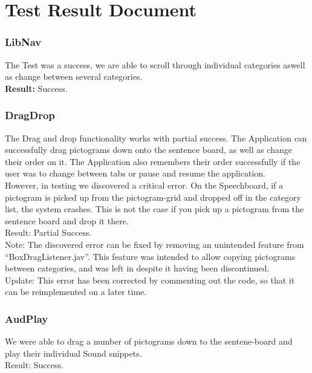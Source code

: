\section{Test Result Document}

\subsubsection*{LibNav}
The Test was a success, we are able to scroll through individual categories aswell as change between several categories.\\

\textbf{Result:} Success.

\subsubsection*{DragDrop}
The Drag and drop functionality works with partial success.
The Application can successfully drag pictograms down onto the sentence board, as well as change their order on it.
The Application also remembers their order successfully if the user was to change between tabs or pause and resume the application.\\

However, in testing we discovered a critical error. On the Speechboard, if a pictogram is picked up from the pictogram-grid and dropped off in the category list, the system crashes.
This is not the case if you pick up a pictogram from the sentence board and drop it there.\\

Result: Partial Success.\\

Note: The discovered error can be fixed by removing an unintended feature from ``BoxDragListener.jav''. This feature was intended to allow copying pictograms between categories, and was left in despite it having been discontinued. \\

Update: This error has been corrected by commenting out the code, so that it can be reimplemented on a later time.

\subsubsection*{AudPlay}
We were able to drag a number of pictograms down to the sentene-board and play their individual Sound snippets.\\

Result: Success.\\

